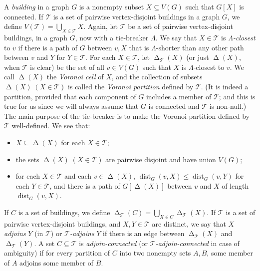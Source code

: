 \documentclass[titlepage,11pt]{article}
\newcommand{\dist}{\operatorname{dist}}
\newcommand{\voro}{\operatorname{\Delta}}
\newcommand{\mac}{\mathcal}
\begin{document}
	A {\em building} in a graph $G$ is a nonempty subset $X\subseteq V(G)$ such that $G[X]$ is connected.
	If $\mathcal{T}$ is a set of pairwise vertex-disjoint buildings in a graph $G$, we define $V(\mac T)=\bigcup_{X\in \mac T}X$. 
	Again, let $\mathcal{T}$ be a set of pairwise vertex-disjoint buildings, in a graph $G$, now with a tie-breaker $\Lambda$. 
	We say that $X\in \mathcal{T}$ is {\em $\Lambda$-closest} to $v$ if there is a path of $G$ between $v,X$ that is $\Lambda$-shorter
	than any other path between $v$ and $Y$ for $Y\in \mathcal{T}$.
	For each $X\in \mathcal{T}$, let $\voro_{\mathcal{T}}(X)$ (or just $\voro(X)$, when $\mathcal{T}$ is clear) be the set of all $v\in V(G)$
	such that $X$ is $\Lambda$-closest to $v$. We call $\voro(X)$ the {\em Voronoi cell} of $X$, and  the collection of subsets $\voro(X)\;(X\in \mathcal{T})$ is called the
	{\em Voronoi partition} defined by $\mathcal{T}$. (It is indeed a partition, provided that each component of
	$G$ includes a member of $\mathcal{T}$; and this is true for us since we will always assume that $G$ is connected and $\mathcal{T}$ is non-null.)
	The main purpose of the tie-breaker is to make the Voronoi partition defined by $\mathcal{T}$ well-defined.
	We see that:
	\begin{itemize}
		\item $X\subseteq \voro(X)$ for each $X\in \mathcal{T}$;
		\item the sets $\voro(X)\;(X\in \mathcal{T})$ are pairwise disjoint and have union $V(G)$;
		\item for each $X\in \mathcal{T}$ and each $v\in \voro(X)$, $\dist_G(v,X)\le \dist_G(v,Y)$ for each $Y\in \mathcal{T}$, and there is
		a path of $G[\voro(X)]$ between $v$ and $X$ of length $\dist_G(v,X)$.
	\end{itemize}
	
	If $C$ is a set of buildings, we define $\voro_{\mac T} (C) = \bigcup_{X\in C}\voro_{\mac T} (X)$. 
	If $\mac T$ is a set of pairwise vertex-disjoint buildings, and $X,Y\in \mac T$ are distinct,  we say that $X$ {\em adjoins} $Y$ 
	(in $\mac T$) or {\em $\mac T$-adjoins} $Y$ if there is an edge between $\voro_{\mac T}(X)$ and $\voro_{\mac T}(Y)$. A set 
	$C\subseteq \mac T$ is {\em adjoin-connected} (or {\em $\mac T$-adjoin-connected} in case of ambiguity) if for every partition of $C$ into two nonempty sets $A,B$, some member of $A$ 
	adjoins some member of $B$. 
	
\end{document}

